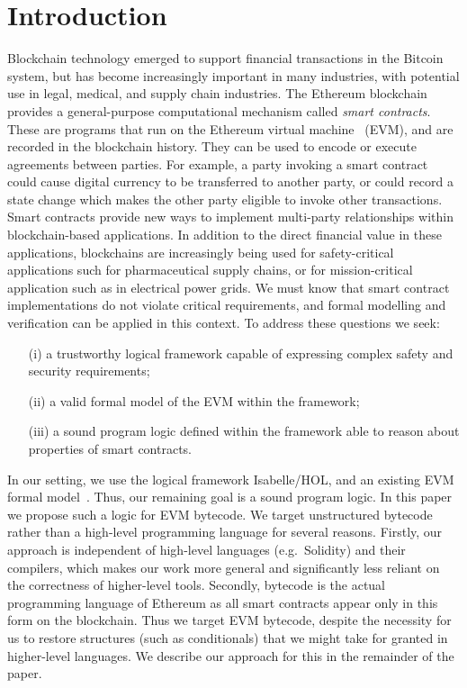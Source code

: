 \documentclass[sigplan,10pt,review]{acmart}\settopmatter{printfolios=true,printccs=false,printacmref=false}
\begin{document}
\section{Introduction}
\label{sec:intro}
Blockchain technology emerged to support financial transactions in the Bitcoin system, but has become
increasingly important in many industries, with potential use in legal, medical, and
supply chain industries.
The Ethereum blockchain provides a general-purpose computational mechanism called \emph{smart contracts}.
These are programs that run on the Ethereum virtual machine~\cite{wood2014ethereum} (EVM), and
are recorded in the blockchain history.  They can be used to encode or execute agreements between parties.
For example, a party invoking a smart contract could cause digital currency to be transferred to another
party, or could record a state change which makes the other party eligible to invoke other transactions.
Smart contracts provide new ways to implement multi-party relationships within blockchain-based applications.
In addition to the direct financial value in these applications, blockchains are increasingly being
used for safety-critical applications such for pharmaceutical supply chains, or for mission-critical
application such as in electrical power grids.
We must know that smart contract implementations do not violate critical requirements, and
formal modelling and verification can be applied in this context.
%
To address these questions we seek:
\begin{itemize}
\item[(i)] a trustworthy logical framework capable of expressing complex safety and security
   requirements; 
\item[(ii)] a valid formal model of the EVM within the framework; 
\item[(iii)] a sound program logic defined within the framework able to
reason about properties of smart contracts. 
\end{itemize}
In our setting, we use the logical framework Isabelle/HOL, and an existing EVM formal
model~\cite{Yoichi}.
Thus, our remaining goal is a sound program logic.  In this paper we propose such a logic for EVM bytecode. 
We target unstructured bytecode rather than a high-level programming language for several reasons.
Firstly, our approach is independent of high-level languages (e.g.\ Solidity) and their compilers, which
makes our work more general and significantly less reliant
on the correctness of higher-level tools.
Secondly, bytecode is the actual programming language of Ethereum as all smart contracts appear only
in this form on the blockchain.
Thus we target EVM bytecode, despite the necessity for us to restore structures (such as conditionals)
that we might take for granted in higher-level languages.
We describe our approach for this in the remainder of the paper. 
\end{document}
